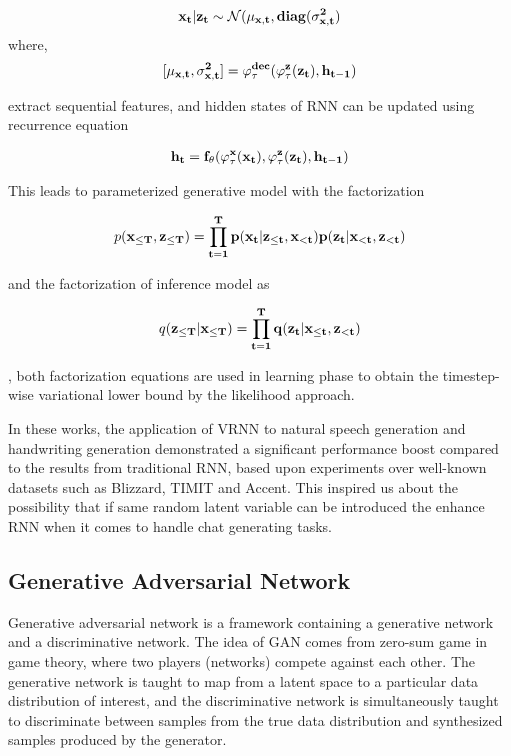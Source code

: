 \documentclass{article}
\begin{document}
$$\bf x_t \bf | z_t \sim \mathcal{N}(\bf \mu _{x,t}, diag(\sigma _{x,t}^2)$$
where,
$$[\bf \mu _{x,t}, \sigma _{x,t}^2] = \varphi^{dec}_{\tau}(\varphi^{\bf z}_{\tau}(\bf z_t),\bf h_{t-1})$$

extract sequential features, and hidden states of RNN can be updated using recurrence equation

\begin{align*}
\bf h_t = f_\theta(\varphi^{\bf x}_\tau (\bf x _t), \varphi^{\bf z}_\tau (\bf z_t), \bf h_{t-1})
\end{align*}

This leads to parameterized generative model with the factorization

\begin{align*}
p(\bf x_{\leq T}, \bf z_{\leq T})=\prod_{t=1}^T p(x_t | z_{\leq t}, x_{<t})p(z_t | x_{<t}, z_{<t})
\end{align*}

and the factorization of inference model as

\begin{align*}
q(\bf z_{\leq T} | \bf x_{\leq T})=\prod_{t=1}^T q(z_t | x_{\leq t}, z_{<t})
\end{align*}

, both factorization equations are used in learning phase to obtain the timestep-wise variational lower bound by the likelihood approach.


In these works, the application of VRNN to natural speech generation and handwriting generation demonstrated a significant performance boost compared to the results from traditional RNN, based upon experiments over well-known datasets such as Blizzard, TIMIT and Accent. This inspired us about the possibility that if same random latent variable can be introduced the enhance RNN when it comes to handle chat generating tasks.

\subsection{Generative Adversarial Network} 

Generative adversarial network \cite{gan} is a framework containing a generative network and a discriminative network. The idea of GAN comes from zero-sum game in game theory, where two players (networks) compete against each other. The generative network is taught to map from a latent space to a particular data distribution of interest, and the discriminative network is simultaneously taught to discriminate between samples from the true data distribution and synthesized samples produced by the generator.
\end{document}
